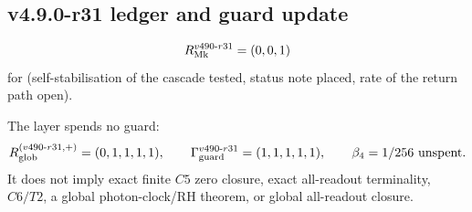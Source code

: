 \subsection*{v4.9.0-r31 ledger and guard update}
\label{subsec:v490-r31-ledger-guard}

\[
R_{\rm Mk}^{v490\text{-}r31}=(0,0,1)
\]
for (self-stabilisation of the cascade tested, status note placed, rate of the return path open).

The layer spends no guard:
\[
R_{\rm glob}^{(v490\text{-}r31,+)}=(0,1,1,1,1),
\qquad
\Gamma_{\rm guard}^{v490\text{-}r31}=(1,1,1,1,1),
\qquad
\beta_4=1/256\ \text{unspent}.
\]
It does not imply exact finite \(C5\) zero closure, exact all-readout terminality,
\(C6/T2\), a global photon-clock/RH theorem, or global all-readout closure.

